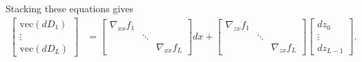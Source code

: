 \documentclass{article}
\begin{document}
Stacking these equations gives
\begin{align}
    \begin{bmatrix}
        \mathrm{vec}\left(dD_1\right) \\
        \vdots                        \\
        \mathrm{vec}\left(dD_L\right)
    \end{bmatrix}
    & =
    \begin{bmatrix}
        \nabla_{xx} f_1 &        &                 \\
                        & \ddots &                 \\
                        &        & \nabla_{xx} f_L
    \end{bmatrix}
    dx
    +
    \begin{bmatrix}
        \nabla_{zx} f_1 &        &                 \\
                        & \ddots &                 \\
                        &        & \nabla_{zx} f_L
    \end{bmatrix}
    \begin{bmatrix}
        dz_0 \\ \vdots \\ dz_{L-1}
    \end{bmatrix}
    .
\end{align}
\end{document}
